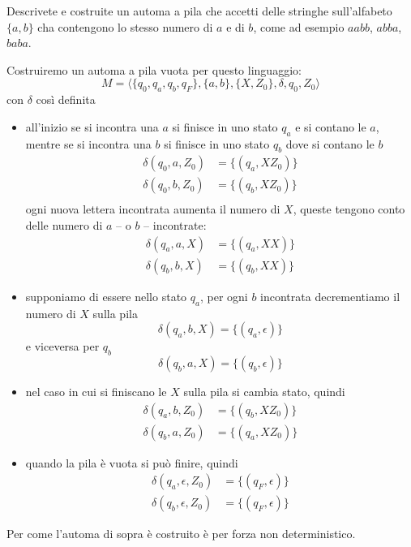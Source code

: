\documentclass[12pt, answers]{exam}
\begin{document}
\begin{questions}
	\question Descrivete e costruite un automa a pila che accetti delle stringhe sull'alfabeto $\{a, b\}$ cha contengono lo stesso numero di $a$ e di $b$, come ad esempio $aabb$, $abba$, $baba$.
	\begin{solution}
		Costruiremo un automa a pila vuota per questo linguaggio:
		$$ M = \langle \{q_0, q_a, q_b, q_F\}, \{a, b\}, \{X, Z_0\}, \delta, q_0, Z_0 \rangle $$
		con $\delta$ così definita
		\begin{itemize}
			\item all'inizio se si incontra una $a$ si finisce in uno stato $q_a$ e si contano le $a$, mentre se si incontra una $b$ si finisce in uno stato $q_b$ dove si contano le $b$
				\begin{align*}
					\delta(q_0, a, Z_0) &= \{ (q_a, XZ_0) \} \\
					\delta(q_0, b, Z_0) &= \{ (q_b, XZ_0) \} \\
				\end{align*}
				ogni nuova lettera incontrata aumenta il numero di $X$, queste tengono conto delle numero di $a$ -- o $b$ -- incontrate:
				\begin{align*}
					\delta(q_a, a, X) &= \{ (q_a, XX) \} \\
					\delta(q_b, b, X) &= \{ (q_b, XX) \} 
				\end{align*}
			\item supponiamo di essere nello stato $q_a$, per ogni $b$ incontrata decrementiamo il numero di $X$ sulla pila
					$$ \delta(q_a, b, X) = \{ (q_a, \epsilon) \} $$
				e viceversa per $q_b$
					$$ \delta(q_b, a, X) = \{ (q_b, \epsilon) \} $$
			\item nel caso in cui si finiscano le $X$ sulla pila si cambia stato, quindi
				\begin{align*}
					\delta(q_a, b, Z_0) &= \{ (q_b, X Z_0)\} \\
					\delta(q_b, a, Z_0) &= \{ (q_a, X Z_0)\} 
				\end{align*}
			\item quando la pila è vuota si può finire, quindi
				\begin{align*}
					\delta(q_a, \epsilon, Z_0) &= \{ (q_F, \epsilon) \} \\
					\delta(q_b, \epsilon, Z_0) &= \{ (q_F, \epsilon) \}
				\end{align*}
		\end{itemize}
		Per come l'automa di sopra è costruito è per forza non deterministico.


\end{solution}
\end{questions}
\end{document}

